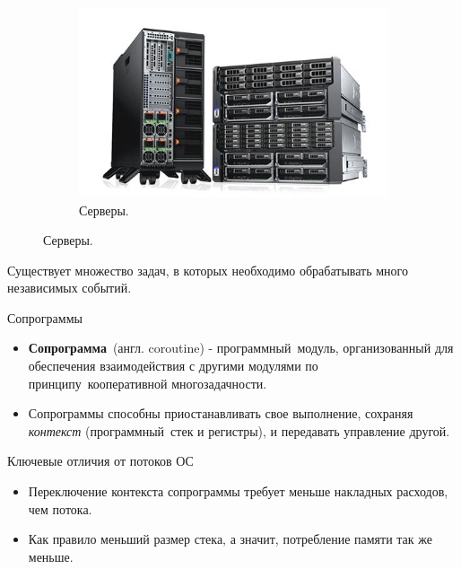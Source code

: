 
{
\begin{frame}[noframenumbering]
		\titlepage
\end{frame}
}

\begin{frame}	
	\begin{figure}[h!]
		\centering
		\begin{subfigure}[b]{0.4\linewidth}
			\includegraphics[width=\linewidth]{images/server.jpg}
			\caption{Серверы.}
		\end{subfigure}
		\hfill
	\end{figure}
	\par
	Существует множество задач, в которых необходимо обрабатывать много независимых событий.
\end{frame}


\begin{frame}{Сопрограммы}
	\begin{itemize}
		\item \textbf{Сопрограмма} (англ. coroutine) - программный модуль, организованный для обеспечения взаимодействия с другими модулями по принципу кооперативной многозадачности.
		
		\item Сопрограммы способны приостанавливать свое выполнение, сохраняя \textit{контекст} 
		(программный стек и регистры), и передавать управление другой.
	\end{itemize}
\end{frame}

\begin{frame}{Ключевые отличия от потоков ОС}
	\begin{itemize}
		\item Переключение контекста сопрограммы требует меньше накладных расходов, чем потока.
		\item Как правило меньший размер стека, а значит, потребление памяти так же меньше.
	\end{itemize}
\end{frame}

